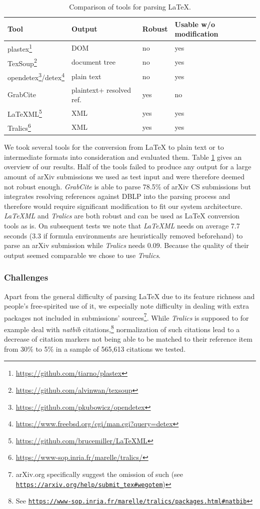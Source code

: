 \begin{table}[t]
\centering
  \caption{Comparison of tools for parsing \LaTeX{}.}
  \label{tbl:tools}
\begin{tabular}{llll}
\toprule
    Tool & Output & Robust & Usable w/o modification \\
   \midrule
    plastex\footnote{\url{https://github.com/tiarno/plastex}} & DOM & no & yes\\
    TexSoup\footnote{\url{https://github.com/alvinwan/texsoup}} & document tree & no & yes\\
    opendetex\footnote{\url{https://github.com/pkubowicz/opendetex}}/detex\footnote{\url{https://www.freebsd.org/cgi/man.cgi?query=detex}} & plain text & no & yes\\
    GrabCite\cite{Faerber2018} & plain\hphantom{ }text\hphantom{ }+ resolved ref. & yes & no\\
    LaTeXML\footnote{\url{https://github.com/brucemiller/LaTeXML}} & XML & yes & yes\\
    Tralics\footnote{\url{https://www-sop.inria.fr/marelle/tralics/}} & XML & yes & yes\\
  \bottomrule
\end{tabular}
\end{table}

We took several tools for the conversion from \LaTeX{} to plain text or to intermediate formats into consideration and evaluated them. Table \ref{tbl:tools} gives an overview of our results. Half of the tools failed to produce any output for a large amount of arXiv submissions we used as test input and were therefore deemed not robust enough. \textit{GrabCite} is able to parse 78.5\% of arXiv CS submissions but integrates resolving references against DBLP into the parsing process and therefore would require significant modification to fit our system architecture. \textit{LaTeXML} and \textit{Tralics} are both robust and can be used as \LaTeX{} conversion tools as is. On subsequent tests we note that \textit{LaTeXML} needs on average 7.7 seconds (3.3 if formula environments are heuristically removed beforehand) to parse an arXiv submission while \textit{Tralics} needs 0.09. Because the quality of their output seemed comparable we chose to use \textit{Tralics}.

\subsubsection{Challenges}
Apart from the general difficulty of parsing \LaTeX{} due to its feature richness and people's free-spirited use of it, we especially note difficulty in dealing with extra packages not included in submissions' sources\footnote{arXiv.org specifically suggest the omission of such (see \texttt{\url{https://arxiv.org/help/submit\_tex\#wegotem}})}. While \textit{Tralics} is supposed to for example deal with \textit{natbib} citations,\footnote{See \texttt{\url{https://www-sop.inria.fr/marelle/tralics/packages.html\#natbib}}} normalization of such citations lead to a decrease of citation markers not being able to be matched to their reference item from 30\% to 5\% in a sample of 565,613 citations we tested.

